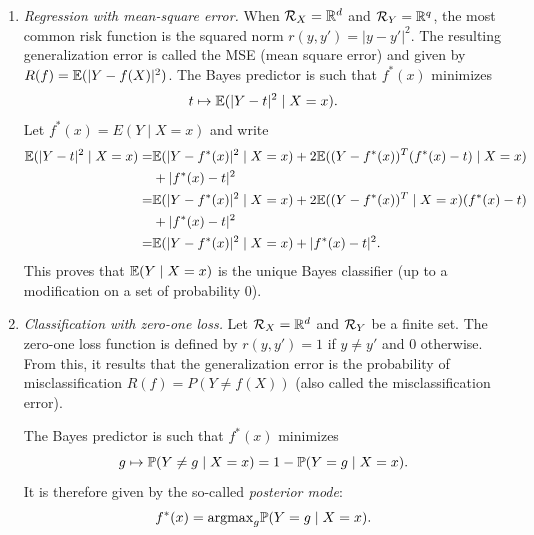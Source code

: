 \begin{enumerate}[label= Example \arabic*., wide=0pt, font=\itshape]
\item {\it Regression with mean-square error.} When ${\mathcal R}_X = {\mathbb{R}}^d$ and ${\mathcal R}_Y = {\mathbb{R}}^{q}$, the most common  risk function is the squared norm $r(y,y') = |y-y'|^{2}$. 
The resulting generalization error is called the MSE (mean square error) and given by $R(f) = \bm{\mathbb E}(|Y-f(X)|^{2})$.
The Bayes predictor is such that $f^{*}(x)$ minimizes 
\[
t \mapsto \bm{\mathbb E}(|Y-t|^{2}\mid X=x).
\]
Let $f^{*}(x) = E(Y\mid X=x)$ and write
\begin{align*}
\bm{\mathbb E}(|Y-t|^{2}\mid X=x) =& \bm{\mathbb E}(|Y-f^*(x)|^{2}\mid X=x) + 2 \bm{\mathbb E}((Y-f^*(x))^T(f^*(x)-t)\mid X=x) \\
&+ |f^*(x) - t|^2\\
=& \bm{\mathbb E}(|Y-f^*(x)|^{2}\mid X=x) + 2 \bm{\mathbb E}((Y-f^*(x))^T\mid X=x)(f^*(x)-t) \\
&+ |f^*(x) - t|^2\\
=& \bm{\mathbb E}(|Y-f^*(x)|^{2}\mid X=x) + |f^*(x) - t|^2.
\end{align*}
This proves that $\bm{\mathbb E}(Y\mid X=x)$ is the unique Bayes classifier (up to a modification on a set of probability 0).
\label{item:Bayes.MSE}
\item {\it Classification with zero-one loss.}
Let ${\mathcal R}_X = {\mathbb{R}}^d$ and ${\mathcal R}_Y$ be a finite set. The zero-one loss function is defined by  $r(y,y') = 1$ if $y\neq y'$ and 0 otherwise.
From this, it results that the generalization error is the probability of misclassification $R(f) = P(Y\neq f(X))$ (also called the misclassification error).

The Bayes predictor is such that $f^{*}(x)$ minimizes 
\[
g \mapsto \bm{\mathbb P}(Y\neq g\mid X=x) = 1 - \bm{\mathbb P}(Y = g\mid X=x).
\]
It is therefore given by the so-called {\it posterior  mode}:
\[
f^{*}(x) = \mathrm{argmax}_{g} \bm{\mathbb P}(Y = g\mid X=x).
\]
\end{enumerate}

